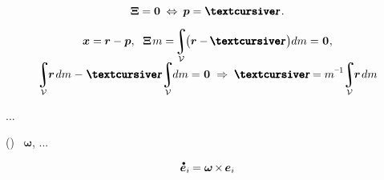\nopagebreak\vspace{-0.2em}\begin{equation*}
\bm{\Xi} = \zerovector
\hspace{.6ex} \Leftrightarrow \hspace{.5ex}
\positionofthepole = \hspace{.1ex} \mathboldrcursive
\hspace{.3ex} .
\end{equation*}

\begin{gather*}
\bm{x} = \hspace{-0.1ex} \locationvector - \positionofthepole
, \hspace{.6em}
\bm{\Xi} \hspace{.2ex} m = \hspace{-0.4ex} \integral_{\mathcal{V}} \hspace{-0.4ex} \bigl( \locationvector - \hspace{-0.1ex} \mathboldrcursive \hspace{.2ex} \bigr) dm = \hspace{.1ex} \zerovector
\hspace{.1ex} ,
\\[-0.4em]
%
\integral_{\mathcal{V}} \hspace{-0.7ex} \locationvector \hspace{.25ex} dm \hspace{.1ex}
- \hspace{.2ex} \mathboldrcursive \hspace{-0.3ex} \integral_{\mathcal{V}} \hspace{-0.7ex} dm = \hspace{.1ex} \zerovector
\hspace{.7ex} \Rightarrow \hspace{.7ex}
\mathboldrcursive = m^{\hspace{-0.1ex}\expminusone} \hspace{-0.5ex} \integral_{\mathcal{V}} \hspace{-0.7ex} \locationvector \hspace{.25ex} dm
\end{gather*}

...

()
~$\bm{\omega}$, ...

\nopagebreak\begin{equation*}
\mathdotabove{\bm{e}}_i \hspace{-0.16ex}
= \bm{\omega} \hspace{-0.2ex} \times \hspace{-0.2ex} \bm{e}_i
\end{equation*}

